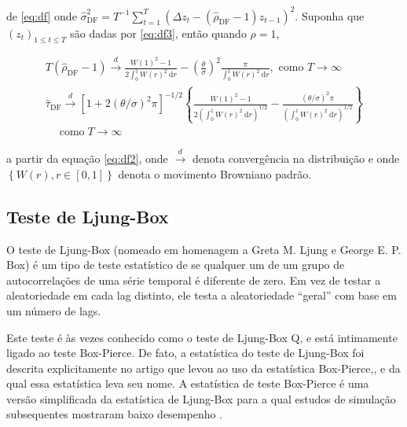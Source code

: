 \noindent de \eqref{eq:df} onde $\hat{\sigma}_{\mathrm{DF}}^2=T^{-1} \sum_{t=1}^T\left(\Delta z_t-\left(\hat{\rho}_{\mathrm{DF}}-1\right) z_{t-1}\right)^2 .$
Suponha que $\left(z_t\right)_{1 \leq t \leq T}$ são dadas por \eqref{eq:df3}, então quando $\rho=1$,


\begin{eqnarray}
	T\left(\hat{\rho}_{\mathrm{DF}}-1\right) \stackrel{d}{\longrightarrow} \frac{W(1)^2-1}{2 \int_0^1 W(r)^2 \mathrm{~d} r}-\left(\frac{\theta}{\sigma}\right)^2 \frac{\pi}{\int_0^1 W(r)^2 \mathrm{~d} r}, \text { como } T \rightarrow \infty \\
	\hat{\tau}_{\mathrm{DF}} \stackrel{d}{\longrightarrow}\left[1+2(\theta / \sigma)^2 \pi\right]^{-1 / 2}\left\{\frac{W(1)^2-1}{2\left(\int_0^1 W(r)^2 \mathrm{~d} r\right)^{1 / 2}}-\frac{(\theta / \sigma)^2 \pi}{\left(\int_0^1 W(r)^2 \mathrm{~d} r\right)^{1 / 2}}\right\} \\
	\quad \operatorname{como} T \rightarrow \infty\label{eq:df2}
\end{eqnarray}

\noindent a partir da equação \eqref{eq:df2}, onde $\stackrel{d}{\longrightarrow}$ denota convergência na distribuição e onde $\left\{W(r), r \in[0,1]\right\}$ denota o movimento Browniano padrão.

\subsection{Teste de Ljung-Box}

O teste de Ljung-Box (nomeado em homenagem a Greta M. Ljung e George E. P. Box) é um tipo de teste estatístico de se qualquer um de um grupo de autocorrelações de uma série temporal é diferente de zero. Em vez de testar a aleatoriedade em cada lag distinto, ele testa a aleatoriedade ``geral'' com base em um número de lags.

Este teste é às vezes conhecido como o teste de Ljung-Box Q, e está intimamente ligado ao teste Box-Pierce. De fato, a estatística do teste de Ljung-Box foi descrita explicitamente no artigo que levou ao uso da estatística Box-Pierce,\cite{box}, \cite{ljung} e da qual essa estatística leva seu nome. A estatística de teste Box-Pierce é uma versão simplificada da estatística de Ljung-Box para a qual estudos de simulação subsequentes mostraram baixo desempenho \cite{dav}.


